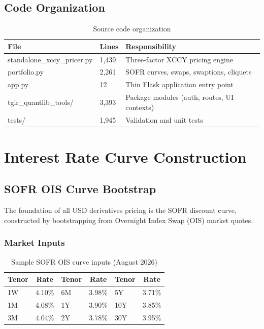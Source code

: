 \documentclass[10pt,a4paper]{article}
\begin{document}
\subsection{Code Organization}

\begin{table}[H]
\centering
\begin{tabular}{llp{7cm}}
\toprule
\textbf{File} & \textbf{Lines} & \textbf{Responsibility} \\
\midrule
standalone\_xccy\_pricer.py & 1,439 & Three-factor XCCY pricing engine \\
portfolio.py & 2,261 & SOFR curves, swaps, swaptions, cliquets \\
app.py & 12 & Thin Flask application entry point \\
tgir\_quantlib\_tools/ & 3,393 & Package modules (auth, routes, UI contexts) \\
tests/ & 1,945 & Validation and unit tests \\
\bottomrule
\end{tabular}
\caption{Source code organization}
\end{table}

\newpage

\section{Interest Rate Curve Construction}

\subsection{SOFR OIS Curve Bootstrap}

The foundation of all USD derivatives pricing is the SOFR discount curve, constructed by bootstrapping from Overnight Index Swap (OIS) market quotes.

\subsubsection{Market Inputs}

\begin{table}[H]
\centering
\begin{tabular}{lclclc}
\toprule
\textbf{Tenor} & \textbf{Rate} & \textbf{Tenor} & \textbf{Rate} & \textbf{Tenor} & \textbf{Rate} \\
\midrule
1W & 4.10\% & 6M & 3.98\% & 5Y & 3.71\% \\
1M & 4.08\% & 1Y & 3.90\% & 10Y & 3.85\% \\
3M & 4.04\% & 2Y & 3.78\% & 30Y & 3.95\% \\
\bottomrule
\end{tabular}
\caption{Sample SOFR OIS curve inputs (August 2026)}
\end{table}
\end{document}

